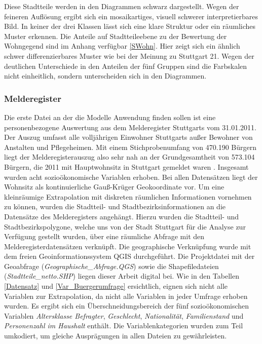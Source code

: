 \documentclass{Vorlage}
\begin{document}
Diese Stadtteile werden in den Diagrammen schwarz dargestellt. Wegen der feineren Auflösung ergibt sich ein 
mosaikartiges, visuell schwerer interpretierbares Bild. In keiner der drei Klassen lässt sich eine klare Struktur oder 
ein räumliches Muster erkennen. Die Anteile auf Stadtteileebene zu der Bewertung der Wohngegend sind im Anhang 
verfügbar \ref{SWohn}. Hier zeigt sich ein ähnlich schwer differenzierbares Muster wie bei der Meinung zu Stuttgart 21. 
Wegen der deutlichen Unterschiede in den Anteilen der fünf Gruppen sind die Farbskalen nicht einheitlich, sondern 
unterscheiden sich in den Diagrammen.\\

\subsubsection{Melderegister}
Die erste Datei an der die Modelle Anwendung finden sollen ist eine personenbezogene Auswertung aus dem Melderegister 
Stuttgarts vom 31.01.2011. Der Auszug umfasst alle volljährigen Einwohner Stuttgarts außer Bewohner von Anstalten und 
Pflegeheimen. Mit einem Stichprobenumfang von 470.190 Bürgern liegt der Melderegisterauszug also sehr nah an 
der Grundgesamtheit von 573.104 Bürgern, die 2011 mit Hauptwohnsitz in Stuttgart gemeldet waren \cite{bundesamt}. Insgesamt wurden acht sozioökonomische Variablen erhoben. Bei allen Datensätzen liegt der Wohnsitz als 
kontinuierliche Gauß-Krüger Geokoordinate vor. Um eine kleinräumige Extrapolation mit diskreten räumlichen 
Informationen vornehmen zu können, wurden die Stadtteil- und Stadtbezirksinformationen an die Datensätze des 
Melderegisters angehängt. Hierzu wurden die Stadtteil- und Stadtbezirkspolygone, welche uns von der Stadt Stuttgart für 
die Analyse zur Verfügung gestellt wurden, über eine räumliche Abfrage mit den Melderegisterdatensätzen verknüpft. Die 
geographische Verknüpfung wurde mit dem freien Geoinformationssystem QGIS \cite{qgis2016} durchgeführt. Die 
Projektdatei mit der Geoabfrage (\textit{Geographische\_Abfrage.QGS}) sowie die Shapefiledateien 
(\textit{Stadtteile\_netto.SHP}) liegen dieser Arbeit digital bei. Wie in den Tabellen \ref{Datensatz} und 
\ref{Var_Buergerumfrage} ersichtlich, eignen sich nicht alle Variablen zur Extrapolation, da nicht alle Variablen in 
jeder Umfrage erhoben wurden. Es ergibt sich ein Überschneidungsbereich der fünf sozioökonomischen Variablen 
\textit{Altersklasse Befragter}, \textit{Geschlecht}, \textit{Nationalität}, \textit{Familienstand} und 
\textit{Personenzahl im Haushalt} enthält. Die Variablenkategorien wurden zum Teil umkodiert, um gleiche Ausprägungen in allen Dateien zu gewährleisten.
\end{document}
